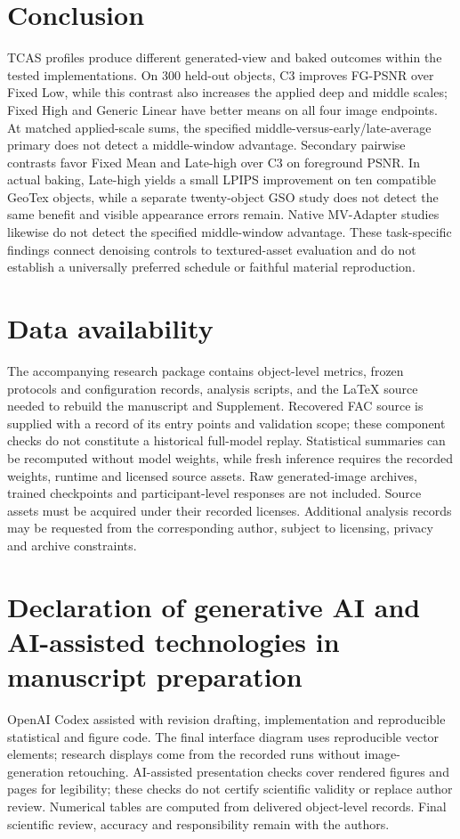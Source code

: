 \documentclass[times,twocolumn,final]{elsarticle}
\begin{document}
\section{Conclusion}
\label{sec:conclusion}

TCAS profiles produce different generated-view and baked outcomes within the tested implementations. On 300 held-out objects, C3 improves FG-PSNR over Fixed Low, while this contrast also increases the applied deep and middle scales; Fixed High and Generic Linear have better means on all four image endpoints. At matched applied-scale sums, the specified middle-versus-early/late-average primary does not detect a middle-window advantage. Secondary pairwise contrasts favor Fixed Mean and Late-high over C3 on foreground PSNR. In actual baking, Late-high yields a small LPIPS improvement on ten compatible GeoTex objects, while a separate twenty-object GSO study does not detect the same benefit and visible appearance errors remain. Native MV-Adapter studies likewise do not detect the specified middle-window advantage. These task-specific findings connect denoising controls to textured-asset evaluation and do not establish a universally preferred schedule or faithful material reproduction.

\section*{Data availability}

The accompanying research package contains object-level metrics, frozen protocols and configuration records, analysis scripts, and the LaTeX source needed to rebuild the manuscript and Supplement. Recovered FAC source is supplied with a record of its entry points and validation scope; these component checks do not constitute a historical full-model replay. Statistical summaries can be recomputed without model weights, while fresh inference requires the recorded weights, runtime and licensed source assets. Raw generated-image archives, trained checkpoints and participant-level responses are not included. Source assets must be acquired under their recorded licenses. Additional analysis records may be requested from the corresponding author, subject to licensing, privacy and archive constraints.

\section*{Declaration of generative AI and AI-assisted technologies in manuscript preparation}
OpenAI Codex assisted with revision drafting, implementation and reproducible statistical and figure code. The final interface diagram uses reproducible vector elements; research displays come from the recorded runs without image-generation retouching. AI-assisted presentation checks cover rendered figures and pages for legibility; these checks do not certify scientific validity or replace author review. Numerical tables are computed from delivered object-level records. Final scientific review, accuracy and responsibility remain with the authors.
\end{document}
